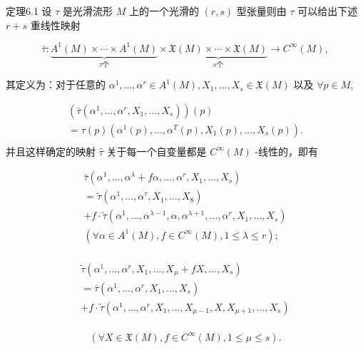 定理6.1 设  $\tau$  是光滑流形  $M$  上的一个光滑的  $(r, s)$  型张量则由  $\tau$  可以给出下述  $r + s$  重线性映射

$$
\bar {\tau}: \underbrace {A ^ {1} (M) \times \cdots \times A ^ {1} (M)} _ {\tau \text {个}} \times \underbrace {\mathfrak {X} (M) \times \cdots \times \mathfrak {X} (M)} _ {s \text {个}} \rightarrow C ^ {\infty} (M), %
$$

其定义为：对于任意的  $\alpha^1,\dots ,\alpha^r\in A^1 (M),X_1,\dots ,X_s\in \mathfrak{X}(M)$  以及 $\forall p\in M,$

$$
\begin{array}{l} (\bar {\tau} (\alpha^ {1}, \dots , \alpha^ {r}, X _ {1}, \dots , X _ {s})) (p) \\ = \tau (p) \left(\alpha^ {1} (p), \dots , \alpha^ {T} (p), X _ {1} (p), \dots , X _ {s} (p)\right). %
\\ \end{array}
$$
并且这样确定的映射  $\hat{\tau}$  关于每一个自变量都是  $C^\infty (M)$  -线性的，即有

$$
\begin{array}{l} \bar {\tau} \left(\alpha^ {1}, \dots , \alpha^ {\lambda} + f \alpha , \dots , \alpha^ {r}, X _ {1}, \dots , X _ {s}\right) \\ = \tilde {\tau} \left(\alpha^ {1}, \dots , \alpha^ {\tau}, X _ {1}, \dots , X _ {8}\right) \\ + f \cdot \tilde {\tau} (\alpha^ {1}, \dots , \alpha^ {\lambda - 1}, \alpha , \alpha^ {\lambda + 1}, \dots , \alpha^ {r}, X _ {1}, \dots , X _ {s}) \\ (\forall \alpha \in A ^ {1} (M), f \in C ^ {\infty} (M), 1 \leqslant \lambda \leqslant r); %
 \\ \end{array}
$$

$$
\begin{array}{l} \tilde {\tau} \left(\alpha^ {1}, \dots , \alpha^ {r}, X _ {1}, \dots , X _ {\mu} + f X, \dots , X _ {s}\right) \\ = \bar {\tau} \left(\alpha^ {1}, \dots , \alpha^ {r}, X _ {1}, \dots , X _ {s}\right) \\ + f \cdot \tilde {\tau} \left(\alpha^ {1}, \dots , \alpha^ {r}, X _ {1}, \dots , X _ {\mu - 1}, X, X _ {\mu + 1}, \dots , X _ {s}\right) \\ \end{array}
$$

$$
(\forall X \in \mathfrak {X} (M), f \in C ^ {\infty} (M), 1 \leqslant \mu \leqslant s). %
$$

